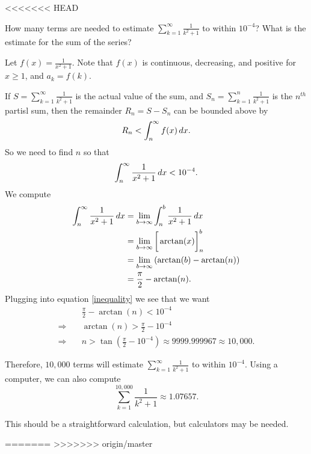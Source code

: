 \documentclass[handout]{ximera}
\begin{document}
<<<<<<< HEAD
\begin{problem}
How many terms are needed to estimate $\sum_{k=1}^\infty \frac{1}{k^2+1}$ to within $10^{-4}$?
What is the estimate for the sum of the series?
	\begin{freeResponse}
	Let $f(x) = \frac{1}{x^2 + 1}$.  
	Note that $f(x)$ is continuous, decreasing, and positive for $x \geq 1$, and $a_k = f(k)$.  
	
	If $S = \sum_{k=1}^\infty \frac{1}{k^2 + 1}$ is the actual value of the sum, and $S_n = \sum_{k=1}^n \frac{1}{k^2 + 1}$ is the $n^{th}$ partisl sum, then the remainder $R_n = S - S_n$ can be bounded above by
		\[
		R_n < \int_n^\infty f(x) \,d x.
		\]
	So we need to find $n$ so that
		\begin{equation}\label{inequality}
		\int_n^\infty \frac{1}{x^2 + 1} \,d x < 10^{-4}.
		\end{equation}
	We compute
		\begin{align*}
		\int_n^\infty \frac{1}{x^2 + 1} \,d x
		&= \lim_{b \to \infty} \int_n^b \frac{1}{x^2+1} \,d x  \\
		&= \lim_{b \to \infty} \bigg[  \arctan(x)  \bigg]_n^b  \\
		&= \lim_{b \to \infty} \left( \arctan(b) - \arctan(n) \right)  \\
		&= \frac{\pi}{2} - \arctan(n).
		\end{align*}
	Plugging into equation \eqref{inequality} we see that we want
		\begin{align*}
		&\frac{\pi}{2} - \arctan(n) < 10^{-4}  \\
		\Longrightarrow 	\quad	&\arctan(n) > \frac{\pi}{2} - 10^{-4}  \\
		\Longrightarrow 	\quad	&n > \tan \left( \frac{\pi}{2} - 10^{-4} \right) \approx 9999.999967 \approx 10,000.
		\end{align*}
		
	Therefore, $10,000$ terms will estimate $\sum_{k=1}^\infty \frac{1}{k^2+1}$ to within $10^{-4}$.  
	Using a computer, we can also compute
		\[
		\sum_{k=1}^{10,000} \frac{1}{k^2+1} \approx 1.07657.
		\]
	\end{freeResponse}
		
\end{problem}

\begin{instructorNotes}
This should be a straightforward calculation, but calculators may be needed.
\end{instructorNotes}













=======
>>>>>>> origin/master



	
	
	
	
	
	
	
	
	

	










								
				
				
	
\end{document}
